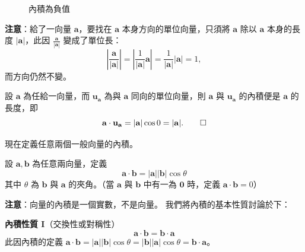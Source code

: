 \begin{figure}[H]
\begin{minipage}{0.48\textwidth}
\caption*{此時投影量 $|\mathbf{a}|\cos\theta < 0$，即 $\mathbf{a}\cdot\mathbf{u} < 0$}
\caption{內積為負值}
\label{fig:b3s-fig3-36-2}
\end{minipage}
\end{figure}

\textbf{注意}：給了一向量 $\mathbf{a}$，要找在 $\mathbf{a}$ 本身方向的單位向量，只須將 $\mathbf{a}$ 除以 $\mathbf{a}$ 本身的長度 $|\mathbf{a}|$，此因 $\frac{\mathbf{a}}{|\mathbf{a}|}$ 變成了單位長：
\[ \left|\frac{\mathbf{a}}{|\mathbf{a}|}\right| = \left|\frac{1}{|\mathbf{a}|}\mathbf{a}\right| = \frac{1}{|\mathbf{a}|}|\mathbf{a}| = 1, \]
而方向仍然不變。

\begin{proposition}
設 $\mathbf{a}$ 為任給一向量，而 $\mathbf{u}_\mathbf{a}$ 為與 $\mathbf{a}$ 同向的單位向量，則 $\mathbf{a}$ 與 $\mathbf{u}_\mathbf{a}$ 的內積便是 $\mathbf{a}$ 的長度，即
\[ \mathbf{a}\cdot\mathbf{u}_\mathbf{a} = |\mathbf{a}|\cos 0 = |\mathbf{a}|. \qedhere \]
\end{proposition}

現在定義任意兩個一般向量的內積。
\begin{definition}
設 $\mathbf{a}, \mathbf{b}$ 為任意兩向量，定義
\[ \mathbf{a}\cdot\mathbf{b} = |\mathbf{a}||\mathbf{b}|\cos\theta \]
其中 $\theta$ 為 $\mathbf{b}$ 與 $\mathbf{a}$ 的夾角。（當 $\mathbf{a}$ 與 $\mathbf{b}$ 中有一為 $\mathbf{0}$ 時，定義 $\mathbf{a}\cdot\mathbf{b} = 0$）
\end{definition}

\textbf{注意}：向量的內積是一個實數，不是向量。
我們將內積的基本性質討論於下：

\textbf{內積性質 I}（交換性或對稱性）
\[ \mathbf{a}\cdot\mathbf{b} = \mathbf{b}\cdot\mathbf{a} \]
此因內積的定義 $\mathbf{a}\cdot\mathbf{b} = |\mathbf{a}||\mathbf{b}|\cos\theta = |\mathbf{b}||\mathbf{a}|\cos\theta = \mathbf{b}\cdot\mathbf{a}$。

